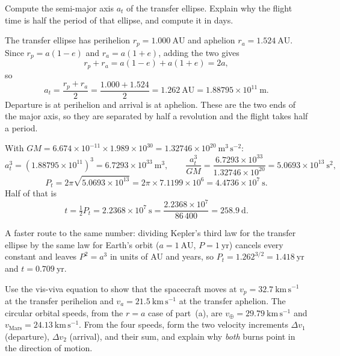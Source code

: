 \parti Compute the semi-major axis $a_t$ of the transfer ellipse. Explain why the flight
time is half the period of that ellipse, and compute it in days.

\begin{solution}
The transfer ellipse has perihelion $r_p = 1.000\ \mathrm{AU}$ and aphelion
$r_a = 1.524\ \mathrm{AU}$. Since $r_p = a(1 - e)$ and $r_a = a(1 + e)$, adding the two gives
\[
  r_p + r_a = a(1 - e) + a(1 + e) = 2a,
\]
so
\[
  a_t = \frac{r_p + r_a}{2} = \frac{1.000 + 1.524}{2} = 1.262\ \mathrm{AU}
      = 1.88795 \times 10^{11}\ \mathrm{m}.
\]
Departure is at perihelion and arrival is at aphelion. These are the two ends of the major axis, so
they are separated by half a revolution and the flight takes half a period.

With $GM = 6.674 \times 10^{-11} \times 1.989 \times 10^{30}
      = 1.32746 \times 10^{20}\ \mathrm{m^3\,s^{-2}}$:
\[
  a_t^3 = (1.88795 \times 10^{11})^3 = 6.7293 \times 10^{33}\ \mathrm{m^3},
  \qquad
  \frac{a_t^3}{GM} = \frac{6.7293 \times 10^{33}}{1.32746 \times 10^{20}}
                   = 5.0693 \times 10^{13}\ \mathrm{s^2},
\]
\[
  P_t = 2\pi \sqrt{5.0693 \times 10^{13}}
      = 2\pi \times 7.1199 \times 10^{6}
      = 4.4736 \times 10^{7}\ \mathrm{s}.
\]
Half of that is
\[
  t = \tfrac{1}{2} P_t = 2.2368 \times 10^{7}\ \mathrm{s}
    = \frac{2.2368 \times 10^{7}}{86\,400} = 258.9\ \mathrm{d}.
\]

A faster route to the same number: dividing Kepler's third law for the transfer ellipse by the
same law for Earth's orbit ($a = 1\ \mathrm{AU}$, $P = 1\ \mathrm{yr}$) cancels every constant
and leaves $P^2 = a^3$ in units of AU and years, so $P_t = 1.262^{3/2} = 1.418\ \mathrm{yr}$ and
$t = 0.709\ \mathrm{yr}$.
\end{solution}

\parti Use the vis-viva equation to show that the spacecraft moves at
$v_p = 32.7\ \mathrm{km\,s^{-1}}$ at the transfer perihelion and $v_a = 21.5\ \mathrm{km\,s^{-1}}$
at the transfer aphelion. The circular orbital speeds, from the $r = a$ case of part~(a), are
$v_\oplus = 29.79\ \mathrm{km\,s^{-1}}$ and $v_{\mathrm{Mars}} = 24.13\ \mathrm{km\,s^{-1}}$.
From the four speeds, form the two velocity increments $\Delta v_1$ (departure), $\Delta v_2$
(arrival), and their sum, and explain why \emph{both} burns point in the direction of motion.


